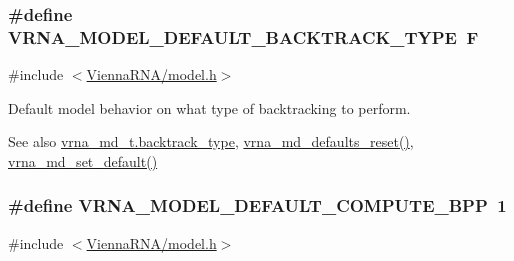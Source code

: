 \subsubsection[{V\+R\+N\+A\+\_\+\+M\+O\+D\+E\+L\+\_\+\+D\+E\+F\+A\+U\+L\+T\+\_\+\+B\+A\+C\+K\+T\+R\+A\+C\+K\+\_\+\+T\+Y\+P\+E}]{\setlength{\rightskip}{0pt plus 5cm}\#define V\+R\+N\+A\+\_\+\+M\+O\+D\+E\+L\+\_\+\+D\+E\+F\+A\+U\+L\+T\+\_\+\+B\+A\+C\+K\+T\+R\+A\+C\+K\+\_\+\+T\+Y\+P\+E~\textquotesingle{}F\textquotesingle{}}\label{group__model__details_gad0e81fcaca53c4a826c68e0796de2afb}


{\ttfamily \#include $<$\hyperlink{model_8h}{Vienna\+R\+N\+A/model.\+h}$>$}



Default model behavior on what type of backtracking to perform. 

\begin{DoxySeeAlso}{See also}
\hyperlink{group__model__details_abb265da25121d22ed11c8435861f0e53}{vrna\+\_\+md\+\_\+t.\+backtrack\+\_\+type}, \hyperlink{group__model__details_ga70834424cf804d149937de89f80ceb45}{vrna\+\_\+md\+\_\+defaults\+\_\+reset()}, \hyperlink{group__model__details_ga8ac6ff84936282436f822644bf841f66}{vrna\+\_\+md\+\_\+set\+\_\+default()} 
\end{DoxySeeAlso}
\hypertarget{group__model__details_ga1d6cd5051940b126c248147c011bac6c}{}
\subsubsection[{V\+R\+N\+A\+\_\+\+M\+O\+D\+E\+L\+\_\+\+D\+E\+F\+A\+U\+L\+T\+\_\+\+C\+O\+M\+P\+U\+T\+E\+\_\+\+B\+P\+P}]{\setlength{\rightskip}{0pt plus 5cm}\#define V\+R\+N\+A\+\_\+\+M\+O\+D\+E\+L\+\_\+\+D\+E\+F\+A\+U\+L\+T\+\_\+\+C\+O\+M\+P\+U\+T\+E\+\_\+\+B\+P\+P~1}\label{group__model__details_ga1d6cd5051940b126c248147c011bac6c}


{\ttfamily \#include $<$\hyperlink{model_8h}{Vienna\+R\+N\+A/model.\+h}$>$}



